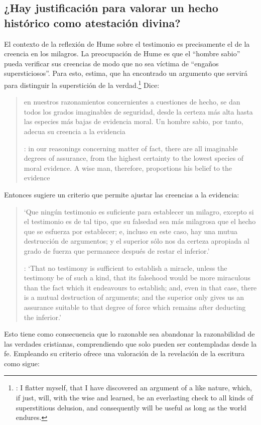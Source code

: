 \subsection{¿Hay justificación para valorar un hecho histórico como
  atestación divina?}
El contexto de la reflexión de Hume sobre el testimonio es precisamente el de la
  creencia en los milagros. La preocupación de Hume es que el \enquote{hombre
  sabio} pueda verificar sus creencias de modo que no sea víctima de
\enquote{engaños supersticiosos}. Para esto, estima, que ha encontrado un
argumento que servirá para distinguir la superstición de
la verdad.\footnote{\cite[\S10,1. 73]{hume1777enquiry}: I flatter myself, that I
  have discovered an argument of a like nature, which, if just, will, with the
  wise and learned, be an everlasting check to all kinds of superstitious
  delusion, and consequently will be useful as long as the world endures.} Dice:

\blockquote[{\cite[\S10,1. 73]{hume1777enquiry}}: in our reasonings concerning
matter of fact, there are all imaginable degrees of assurance, from the highest
certainty to the lowest species of moral evidence. A wise man, therefore,
proportions his belief to the evidence]{en nuestros razonamientos concernientes
  a cuestiones de hecho, se dan todos los grados imaginables de seguridad, desde la
  certeza más alta hasta las especies más bajas de evidencia moral. Un hombre
  sabio, por tanto, adecua su creencia a la evidencia}.

Entonces sugiere un criterio que permite ajustar las creencias
a la evidencia:

\blockquote[{\cite[\S10,1. 77]{hume1777enquiry}}: `That no testimony is
sufficient to establish a miracle, unless the testimony be of such a kind, that
its falsehood would be more miraculous than the fact which it endeavours to
establish; and, even in that case, there is a mutual destruction of arguments;
and the superior only gives us an assurance suitable to that degree of force
which remains after deducting the inferior.']{`Que ningún testimonio es
  suficiente para establecer un milagro, excepto si el testimonio es de tal
  tipo, que su falsedad sea más milagrosa que el hecho que se esfuerza por
  establecer; e, incluso en este caso, hay una mutua destrucción de argumentos;
  y el superior sólo nos da certeza apropiada al grado de fuerza que permanece
  después de restar el inferior.'}

Esto tiene como consecuencia que lo razonable sea abandonar la razonabilidad de
las verdades cristianas, comprendiendo que solo pueden ser contempladas desde la
fe. Empleando su criterio ofrece una valoración de la revelación de la escritura
como sigue:

